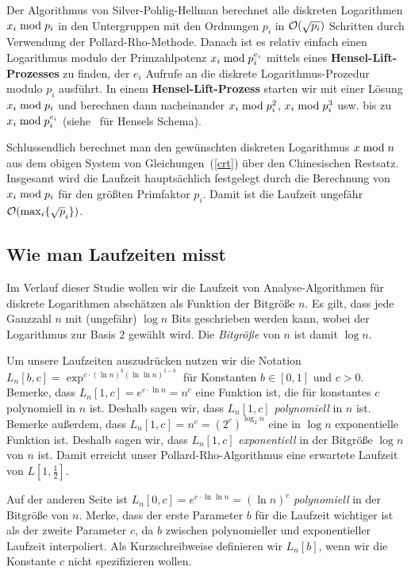 \begin{refsegment}
Der Algorithmus von Silver-Pohlig-Hellman berechnet alle diskreten Logarithmen $x_i \hspace{1mm}{\rm mod}\hspace{1mm} p_i$ in den Untergruppen mit den Ordnungen $p_i$ in ${\cal O}(\sqrt{p_i})$ Schritten durch Verwendung der Pollard-Rho-Methode. Danach ist es relativ einfach einen Logarithmus modulo der Primzahlpotenz $x_i \hspace{1mm}{\rm mod}\hspace{1mm} p_i^{e_i}$ mittels eines \textbf{Hensel-Lift-Prozesses} zu finden, der $e_i$ Aufrufe an die diskrete Logarithmus-Prozedur modulo $p_i$ ausführt. In einem \textbf{Hensel-Lift-Prozess} starten wir mit einer Lösung $x_i \hspace{1mm}{\rm mod}\hspace{1mm} p_i$ und berechnen dann nacheinander $x_i \hspace{1mm}{\rm mod}\hspace{1mm} p_i^2$, $x_i \hspace{1mm}{\rm mod}\hspace{1mm} p_i^3$ usw. bis zu $x_i \hspace{1mm}{\rm mod}\hspace{1mm} p_i^{e_i}$ (siehe~\cite{May2013} für Hensels Schema).

Schlussendlich berechnet man den gewünschten diskreten Logarithmus $x \hspace{1mm}{\rm mod}\hspace{1mm} n$ aus dem obigen System von Gleichungen~(\ref{crt}) über den Chinesischen Restsatz.
Insgesamt wird die Laufzeit hauptsächlich festgelegt durch die Berechnung von $x_i \hspace{1mm}{\rm mod}\hspace{1mm} p_i$ für den größten Primfaktor $p_i$. Damit ist die Laufzeit ungefähr ${\cal O}(\max_i\{\sqrt p_i\})$.


\subsection{Wie man Laufzeiten misst}
Im Verlauf dieser Studie wollen wir die Laufzeit von Analyse-Algorithmen für diskrete Logarithmen abschätzen als Funktion der Bitgröße $n$. Es gilt, dass jede Ganzzahl $n$ mit (ungefähr) $\log n$ Bits geschrieben werden kann, wobei der Logarithmus zur Basis $2$ gewählt wird. Die {\em Bitgröße} von $n$ ist damit $\log n$.

Um unsere Laufzeiten auszudrücken nutzen wir die Notation $L_n[b,c]=\exp^{c \cdot (\ln n)^{b}(\ln\ln n)^{1-b}}$ für Konstanten $b \in [0,1]$ und $c>0$. Bemerke, dass $L_n[1,c]=e^{c \cdot \ln n} = n^c$ eine Funktion ist, die für konstantes $c$ polynomiell in $n$ ist. Deshalb sagen wir, dass $L_n[1,c]$ {\em polynomiell} in $n$ ist. Bemerke außerdem, dass $L_n[1,c]=n^c = (2^{c})^{\log_2 n}$ eine in $\log n$ exponentielle Funktion ist. Deshalb sagen wir, dass $L_n[1,c]$ {\em exponentiell} in der Bitgröße $\log n$ von $n$ ist. Damit erreicht unser Pollard-Rho-Algorithmus eine erwartete Laufzeit von $L[1,\frac 1 2]$.

Auf der anderen Seite ist $L_n[0,c] = e^{c \cdot \ln\ln n} = (\ln n)^c$ {\em polynomiell} in der Bitgröße von $n$. Merke, dass der erste Parameter $b$ für die Laufzeit wichtiger ist als der zweite Parameter $c$, da $b$ zwischen polynomieller und exponentieller Laufzeit interpoliert. Als Kurzschreibweise definieren wir $L_n[b]$, wenn wir die Konstante $c$ nicht spezifizieren wollen.


\end{refsegment}
